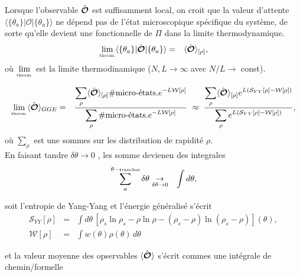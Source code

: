 Lorsque l'observable $\hat{\bm{\mathcal{O}}}$ est suffisamment local, on croit que la valeur d'attente $\langle  \{ \theta_a\}  \vert   \mathcal{O} \vert \{ \theta_a\} \rangle$ ne dépend pas de l'état microscopique spécifique du système, de sorte qu'elle devient une fonctionnelle de $\Pi$ dans la limite thermodynamique.
\begin{eqnarray}
	\underset{\mbox{\tiny therm.}}{\lim} \langle  \{ \theta_a\}  \vert   \hat{\bm{\mathcal{O}}} \vert \{ \theta_a\} \rangle & = & \langle \hat{\bm{\mathcal{O}}}\rangle_{[\rho]},
\end{eqnarray}
où $\underset{\mbox{\tiny therm.}}{\lim}$ est la limite thermodinamique ($N,L \to \infty$ avec $N/L \to $ const).	
	
\begin{eqnarray}
	\underset{\mbox{\tiny therm.}}{\lim} \langle \hat{\bm{\mathcal{O}}} \rangle_{GGE} & =  & \frac{  \displaystyle \sum_{\rho }  \langle \hat{\bm{\mathcal{O}}}\rangle_{[\rho]} \# \mbox{micro-états.} e^{- L\mathcal{W}[\rho]    }}{ \displaystyle \sum_{\rho }  \# \mbox{micro-états.}e^{- L\mathcal{W}[\rho] } } ~ \approx  ~ \frac{  \displaystyle \sum_{\rho }  \langle \hat{\bm{\mathcal{O}}}\rangle_{[\rho]}  e^{L(\mathcal{S}_{YY}[\rho] -  \mathcal{W}[\rho]) }}{ \displaystyle \sum_{\rho } e^{L(\mathcal{S}_{YY}[\rho] -  \mathcal{W}[\rho]) } },
\end{eqnarray}
où $ \sum_{ \rho }$ est une sommes sur les distribution de rapidité $\rho$.\\

En faisant tandre $\delta \theta \to 0 $ , les somme devienen des integrales 
\begin{eqnarray}
\sum_a^{\theta-\mbox{\tiny tranches}}\delta \theta  & \underset{\delta \theta \to 0 }{\rightarrow} & \int d \theta ,	
\end{eqnarray}

soit l'entropie de Yang-Yang et l'énergie généralisé s'écrit 
\begin{eqnarray}
	\mathcal{S}_{YY}[\rho] & = & \int d \theta  \, [ \rho_s\ln \rho_s - \rho \ln \rho - ( \rho_s - \rho ) \ln ( \rho_s - \rho ) ] (\theta) ,\\
	\mathcal{W}[\rho] & = & \int   w(\theta) \rho(\theta) \, d \theta 		
\end{eqnarray}

et la valeur moyenne des opservables $\langle \hat{\bm{\mathcal{O}}} \rangle$ s'écrit commes une intégrale de chemin/formelle

	

	
	
